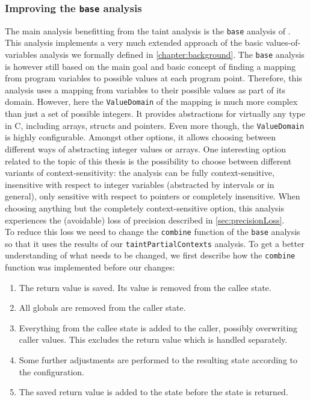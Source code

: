     \subsubsection{Improving the \texttt{base} analysis}
      The main analysis benefitting from the taint analysis is the \texttt{base} analysis of \gob. This analysis implements a very much extended approach of the basic values-of-variables analysis we formally defined in \autoref{chapter:background}. The \texttt{base} analysis is however still based on the main goal and basic concept of finding a mapping from program variables to possible values at each program point. Therefore, this analysis uses a mapping from variables to their possible values as part of its domain. However, here the \texttt{ValueDomain} of the mapping is much more complex than just a set of possible integers. It provides abstractions for virtually any type in C, including arrays, structs and pointers. Even more though, the \texttt{ValueDomain} is highly configurable. Amongst other options, it allows choosing between different ways of abstracting integer values or arrays. One interesting option related to the topic of this thesis is the possibility to choose between different variants of context-sensitivity: the analysis can be fully context-sensitive, insensitive with respect to integer variables (abstracted by intervals or in general), only sensitive with respect to pointers or completely insensitive. When choosing anything but the completely context-sensitive option, this analysis experiences the (avoidable) loss of precision described in \autoref{sec:precisionLoss}.\\
      To reduce this loss we need to change the \texttt{combine} function of the \texttt{base} analysis so that it uses the results of our \texttt{taintPartialContexts} analysis. To get a better understanding of what needs to be changed, we first describe how the \texttt{combine} function was implemented before our changes:
      \begin{enumerate}
        \item The return value is saved. Its value is removed from the callee state.
        \item All globals are removed from the caller state.
        \item Everything from the callee state is added to the caller, possibly overwriting caller values. This excludes the return value which is handled separately.
        \item Some further adjustments are performed to the resulting state according to the configuration.
        \item The saved return value is added to the state before the state is returned.
      \end{enumerate}
